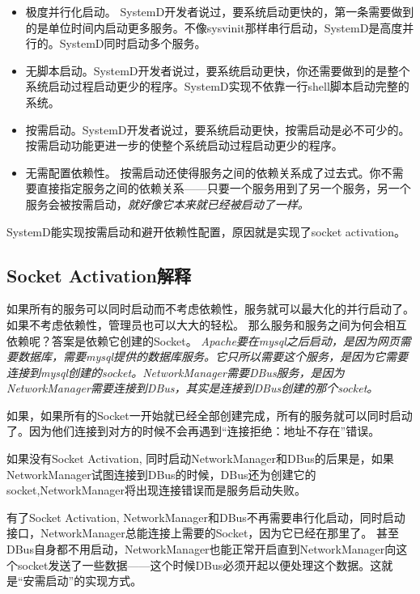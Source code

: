 \documentclass[amstex,twoside]{ctexbook}
\begin{document}
\begin{itemize}
\item 极度并行化启动。
		SystemD开发者说过，要系统启动更快的，第一条需要做到的是单位时间内启动更多服务。不像sysvinit那样串行启动，SystemD是高度并行的。SystemD同时启动多个服务。

\item 无脚本启动。SystemD开发者说过，要系统启动更快，你还需要做到的是整个系统启动过程启动更少的程序。SystemD实现不依靠一行shell脚本启动完整的系统。

\item	按需启动。SystemD开发者说过，要系统启动更快，按需启动是必不可少的。按需启动功能更进一步的使整个系统启动过程启动更少的程序。

\item	无需配置依赖性。
		按需启动还使得服务之间的依赖关系成了过去式。你不需要直接指定服务之间的依赖关系——只要一个服务用到了另一个服务，另一个服务会被按需启动，\em 就好像它本来就已经被启动了一样。

\end{itemize}

SystemD能实现按需启动和避开依赖性配置，原因就是实现了socket activation。

\subsection*{Socket Activation解释}
如果所有的服务可以同时启动而不考虑依赖性，服务就可以最大化的并行启动了。如果不考虑依赖性，管理员也可以大大的轻松。
那么服务和服务之间为何会相互依赖呢？答案是依赖它创建的Socket。{ \it Apache要在mysql之后启动，是因为网页需要数据库，需要mysql提供的数据库服务。它只所以需要这个服务，是因为它需要连接到mysql创建的socket。NetworkManager需要DBus服务，是因为NetworkManager需要连接到DBus，其实是连接到DBus创建的那个socket。}

如果，如果所有的Socket一开始就已经全部创建完成，所有的服务就可以同时启动了。因为他们连接到对方的时候不会再遇到“连接拒绝：地址不存在”错误。

如果没有Socket Activation, 同时启动NetworkManager和DBus的后果是，如果NetworkManager试图连接到DBus的时候，DBus还为创建它的socket,NetworkManager将出现连接错误而是服务启动失败。

有了Socket Activation, NetworkManager和DBus不再需要串行化启动，同时启动接口，NetworkManager总能连接上需要的Socket，因为它已经在那里了。
甚至DBus自身都不用启动，NetworkManager也能正常开启直到NetworkManager向这个socket发送了一些数据——这个时候DBus必须开起以便处理这个数据。这就是“安需启动”的实现方式。
\end{document}
